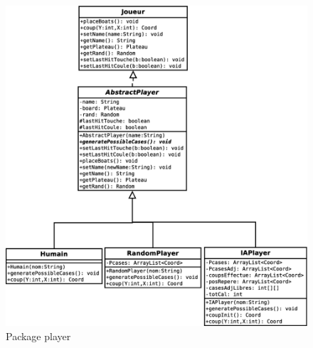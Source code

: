 \documentclass{article}
\begin{document}
\begin{figure}[htp]
\centering
\includegraphics[scale=0.4]{images/Diagramme/package_player.eps}
\caption{\label{fig:Player}Package player}
\end{figure}
\end{document}
